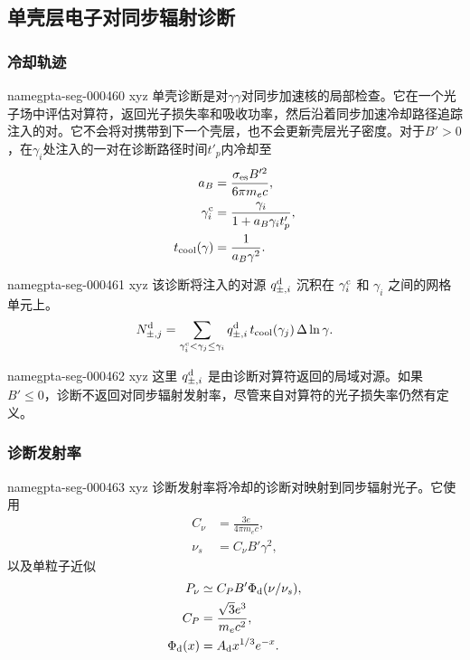\documentclass[twocolumn]{aastex702}
\makeatletter
\providecommand{\gptareaderanchor}[1]{\pdfdest name{#1} xyz}%
\providecommand{\gptareaderanchor}[1]{\special{pdf:dest (#1) [ @thispage /XYZ @xpos @ypos null ]}}%
\makeatother
\begin{document}
\subsection{单壳层电子对同步辐射诊断}

\subsubsection{冷却轨迹}


\gptareaderanchor{gpta-seg-000460}%
单壳诊断是对\(\gamma\gamma\)对同步加速核的局部检查。它在一个光子场中评估对算符，返回光子损失率和吸收功率，然后沿着同步加速冷却路径追踪注入的对。它不会将对携带到下一个壳层，也不会更新壳层光子密度。对于\(B'>0\)，在\(\gamma_i\)处注入的一对在诊断路径时间\(t'_p\)内冷却至
\begin{equation}
\begin{aligned}
a_B&=\frac{\sigma_{\rm es}B'^2}{6\pi m_ec},\\
\gamma_i^{\rm c}&=
\frac{\gamma_i}{1+a_B\gamma_i t'_p},\\
t_{\rm cool}(\gamma)&=\frac{1}{a_B\gamma^2}.
\end{aligned}
\end{equation}

\gptareaderanchor{gpta-seg-000461}%
该诊断将注入的对源 \(q_{\pm,i}^{\rm d}\) 沉积在 \(\gamma_i^{\rm c}\) 和 \(\gamma_i\) 之间的网格单元上。
\begin{equation}
N_{\pm,j}^{\rm d}
=
\sum_{\gamma_i^{\rm c}<\gamma_j\le\gamma_i}
q_{\pm,i}^{\rm d}\,t_{\rm cool}(\gamma_j)\,\Delta\ln\gamma .
\end{equation}

\gptareaderanchor{gpta-seg-000462}%
这里 \(q_{\pm,i}^{\rm d}\) 是由诊断对算符返回的局域对源。如果 \(B'\le0\)，诊断不返回对同步辐射发射率，尽管来自对算符的光子损失率仍然有定义。

\subsubsection{诊断发射率}


\gptareaderanchor{gpta-seg-000463}%
诊断发射率将冷却的诊断对映射到同步辐射光子。它使用
\begin{equation}
\begin{aligned}
C_\nu&=\frac{3e}{4\pi m_ec},\\
\nu_s&=C_\nu B'\gamma^2,
\end{aligned}
\end{equation}
以及单粒子近似
\begin{equation}
\begin{aligned}
P_\nu&\simeq C_PB'\Phi_{\rm d}(\nu/\nu_s),\\
C_P&=\frac{\sqrt{3}e^3}{m_ec^2},\\
\Phi_{\rm d}(x)&=A_{\rm d}x^{1/3}e^{-x}.
\end{aligned}
\end{equation}
\end{document}
